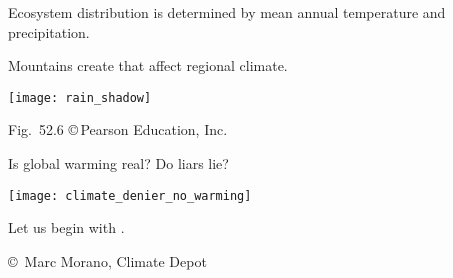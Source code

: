 \documentclass[t,handout]{beamer}  %
\begin{document}
{
	\begin{frame}[b]{Ecosystem distribution is determined by mean annual temperature and precipitation.}
		
	\end{frame}
}
%
\begin{frame}[t]{Mountains create  that affect regional climate.}
	
	\bigskip
	
	\texttt{[image: rain\_shadow]}
	
	\vfilll
	
	\hfill \tiny Fig.~52.6 \copyright\,Pearson Education, Inc.
\end{frame}
%
{
	\begin{frame}[b]
		
	\end{frame}
}
%
\begin{frame}[t]{Is global warming real? Do liars lie?}
	\begin{center}
		\texttt{[image: climate\_denier\_no\_warming]}
	\end{center}

	Let us begin with .
	
	\vfilll
	
	\hfill \tiny \copyright~Marc Morano, Climate Depot
\end{frame}

%

\end{document}
